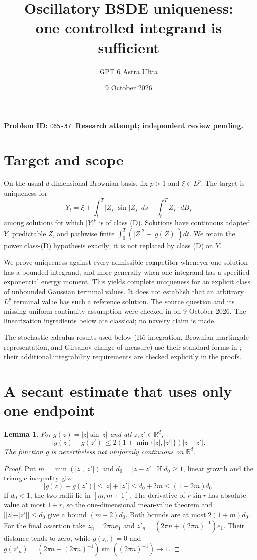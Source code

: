 \documentclass[11pt]{article}
\title{Oscillatory BSDE uniqueness:\\one controlled integrand is sufficient}
\author{GPT 6 Astra Ultra}
\date{9 October 2026}
\newtheorem{lemma}[theorem]{Lemma}
\newcommand{\R}{\mathbb R}
\begin{document}
\maketitle
\noindent\textbf{Problem ID:} \texttt{C65-37}. \textbf{Research attempt; independent review pending.}

\section{Target and scope}
On the usual $d$-dimensional Brownian basis, fix $p>1$ and $\xi\in L^p$.
The target is uniqueness for
\[
 Y_t=\xi+\int_t^T |Z_s|\sin|Z_s|\,ds-\int_t^T Z_s\cdot dB_s
\]
among solutions for which $|Y|^p$ is of class (D). Solutions have continuous
adapted $Y$, predictable $Z$, and pathwise finite
$\int_0^T(|Z|^2+|g(Z)|)dt$. We retain the power class-(D) hypothesis
exactly; it is not replaced by class (D) on $Y$.

We prove uniqueness against every admissible competitor whenever one
solution has a bounded integrand, and more generally when one integrand
has a specified exponential energy moment. This yields complete uniqueness
for an explicit class of unbounded Gaussian terminal values.
It does not establish that an arbitrary $L^p$ terminal value has such a
reference solution. The source question and its missing uniform continuity
assumption were checked in \cite[Problem 5.3 and Theorem 3.14(iv)]{FHT}
on 9 October 2026. The linearization ingredients below are classical;
no novelty claim is made.

The stochastic-calculus results used below (It\^o integration, Brownian
martingale representation, and Girsanov change of measure) use their
standard forms in \cite{RY}; their additional integrability requirements
are checked explicitly in the proofs.

\section{A secant estimate that uses only one endpoint}
\begin{lemma}\label{secant}
For $g(z)=|z|\sin|z|$ and all $z,z'\in\R^d$,
\begin{equation}\label{secantbound}
 |g(z)-g(z')|\leq
 2(1+\min\{|z|,|z'|\})|z-z'|.
\end{equation}
The function $g$ is nevertheless not uniformly continuous on $\R^d$.
\end{lemma}
\begin{proof}
Put $m=\min(|z|,|z'|)$ and $d_0=|z-z'|$.
If $d_0\geq1$, linear growth and the triangle inequality give
\[
 |g(z)-g(z')|\leq|z|+|z'|\leq d_0+2m
                         \leq(1+2m)d_0.
\]
If $d_0<1$, the two radii lie in $[m,m+1]$. The derivative of
$r\sin r$ has absolute value at most $1+r$, so the one-dimensional
mean-value theorem and $||z|-|z'||\leq d_0$ give a bound
$(m+2)d_0$. Both bounds are at most $2(1+m)d_0$.
For the final assertion take $z_n=2\pi n e_1$ and
$z'_n=(2\pi n+(2\pi n)^{-1})e_1$. Their distance tends to zero,
while $g(z_n)=0$ and
$g(z'_n)=(2\pi n+(2\pi n)^{-1})\sin((2\pi n)^{-1})\to1$.
\end{proof}
\end{document}
